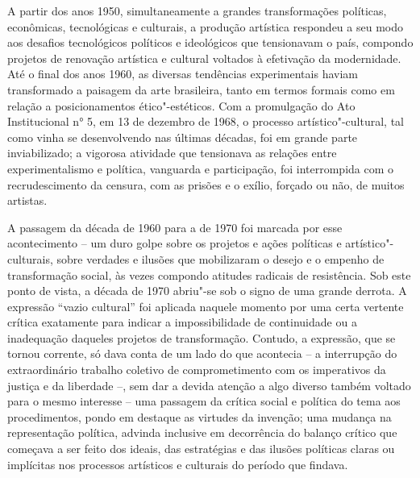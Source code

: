 \pagebreak
\thispagestyle{empty}

\movetooddpage

A partir dos anos 1950, simultaneamente a grandes transformações
políticas, econômicas, tecnológicas e culturais, a produção artística
respondeu a seu modo aos desafios tecnológicos políticos e ideológicos
que tensionavam o país, compondo projetos de renovação artística e
cultural voltados à efetivação da modernidade. Até o final dos anos
1960, as diversas tendências experimentais haviam transformado a
paisagem da arte brasileira, tanto em termos formais como em relação a
posicionamentos ético"-estéticos. Com a promulgação do Ato Institucional
n° 5, em 13 de dezembro de 1968, o processo artístico"-cultural, tal como
vinha se desenvolvendo nas últimas décadas, foi em grande parte
inviabilizado; a vigorosa atividade que tensionava as relações entre
experimentalismo e política, vanguarda e participação, foi interrompida
com o recrudescimento da censura, com as prisões e o exílio, forçado ou
não, de muitos artistas.

A passagem da década de 1960 para a de 1970 foi marcada por esse
acontecimento -- um duro golpe sobre os projetos e ações políticas e
artístico"-culturais, sobre verdades e ilusões que mobilizaram o desejo e
o empenho de transformação social, às vezes compondo atitudes radicais
de resistência. Sob este ponto de vista, a década de 1970 abriu"-se sob o
signo de uma grande derrota. A expressão ``vazio cultural'' foi aplicada
naquele momento por uma certa vertente crítica exatamente para indicar a
impossibilidade de continuidade ou a inadequação daqueles projetos de
transformação. Contudo, a expressão, que se tornou corrente, só dava
conta de um lado do que acontecia -- a interrupção do extraordinário
trabalho coletivo de comprometimento com os imperativos da justiça e da
liberdade --, sem dar a devida atenção a algo diverso também voltado
para o mesmo interesse -- uma passagem da crítica social e política do
tema aos procedimentos, pondo em destaque as virtudes da invenção; uma
mudança na representação política, advinda inclusive em decorrência do
balanço crítico que começava a ser feito dos ideais, das estratégias e
das ilusões políticas claras ou implícitas nos processos artísticos e
culturais do período que findava.

